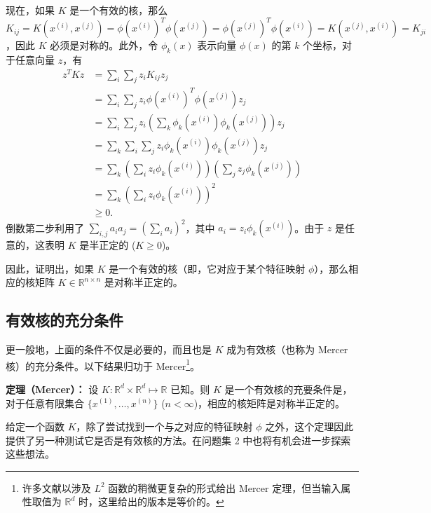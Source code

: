 现在，如果 $K$ 是一个有效的核，那么 $K_{ij} = K(x^{(i)}, x^{(j)}) = \phi(x^{(i)})^T \phi(x^{(j)}) = \phi(x^{(j)})^T \phi(x^{(i)}) = K(x^{(j)}, x^{(i)}) = K_{ji}$，因此 $K$ 必须是对称的。此外，令 $\phi_k(x)$ 表示向量 $\phi(x)$ 的第 $k$ 个坐标，对于任意向量 $z$，有
\begin{align*} 
    z^T K z &= \sum_i \sum_j z_i K_{ij} z_j \\ 
    &= \sum_i \sum_j z_i \phi(x^{(i)})^T \phi(x^{(j)}) z_j \\ 
    &= \sum_i \sum_j z_i \left( \sum_k \phi_k(x^{(i)}) \phi_k(x^{(j)}) \right) z_j \\ 
    &= \sum_k \sum_i \sum_j z_i \phi_k(x^{(i)}) \phi_k(x^{(j)}) z_j \\ 
    &= \sum_k \left( \sum_i z_i \phi_k(x^{(i)}) \right) \left( \sum_j z_j \phi_k(x^{(j)}) \right) \\ 
    &= \sum_k \left( \sum_i z_i \phi_k(x^{(i)}) \right)^2 \\ 
    &\ge 0. 
\end{align*}
倒数第二步利用了 $\sum_{i,j} a_i a_j = (\sum_i a_i)^2$，其中 $a_i = z_i \phi_k(x^{(i)})$。由于 $z$ 是任意的，这表明 $K$ 是半正定的 ($K \ge 0$)。

因此，证明出，如果 $K$ 是一个有效的核（即，它对应于某个特征映射 $\phi$），那么相应的核矩阵 $K \in \mathbb{R}^{n \times n}$ 是对称半正定的。

\subsection*{有效核的充分条件}

更一般地，上面的条件不仅是必要的，而且也是 $K$ 成为有效核（也称为 Mercer 核）的充分条件。以下结果归功于 Mercer\footnote{许多文献以涉及 $L^2$ 函数的稍微更复杂的形式给出 Mercer 定理，但当输入属性取值为 $\mathbb{R}^d$ 时，这里给出的版本是等价的。}。

\noindent\textbf{定理（Mercer）：} 设 $K: \mathbb{R}^d \times \mathbb{R}^d \mapsto \mathbb{R}$ 已知。则 $K$ 是一个有效核的充要条件是，对于任意有限集合 $\{x^{(1)}, \dots, x^{(n)}\}$ ($n < \infty$)，相应的核矩阵是对称半正定的。

给定一个函数 $K$，除了尝试找到一个与之对应的特征映射 $\phi$ 之外，这个定理因此提供了另一种测试它是否是有效核的方法。在问题集 2 中也将有机会进一步探索这些想法。

